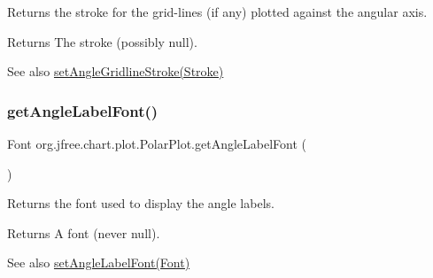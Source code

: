 Returns the stroke for the grid-\/lines (if any) plotted against the angular axis.

\begin{DoxyReturn}{Returns}
The stroke (possibly {\ttfamily null}).
\end{DoxyReturn}
\begin{DoxySeeAlso}{See also}
\mbox{\hyperlink{classorg_1_1jfree_1_1chart_1_1plot_1_1_polar_plot_aba972a51d5f2fb96266662106a3fa01c}{set\+Angle\+Gridline\+Stroke(\+Stroke)}} 
\end{DoxySeeAlso}
\mbox{\label{classorg_1_1jfree_1_1chart_1_1plot_1_1_polar_plot_a928d0e6ae6b209ca6172b710c0b2190a}} 
\subsubsection{\texorpdfstring{get\+Angle\+Label\+Font()}{getAngleLabelFont()}}
{\footnotesize\ttfamily Font org.\+jfree.\+chart.\+plot.\+Polar\+Plot.\+get\+Angle\+Label\+Font (\begin{DoxyParamCaption}{ }\end{DoxyParamCaption})}

Returns the font used to display the angle labels.

\begin{DoxyReturn}{Returns}
A font (never {\ttfamily null}).
\end{DoxyReturn}
\begin{DoxySeeAlso}{See also}
\mbox{\hyperlink{classorg_1_1jfree_1_1chart_1_1plot_1_1_polar_plot_aa61cfe599a9676f076e216b90e109327}{set\+Angle\+Label\+Font(\+Font)}} 
\end{DoxySeeAlso}
\mbox{\label{classorg_1_1jfree_1_1chart_1_1plot_1_1_polar_plot_a49fff6f13418a4bce1c3d20ed9e24927}} 

